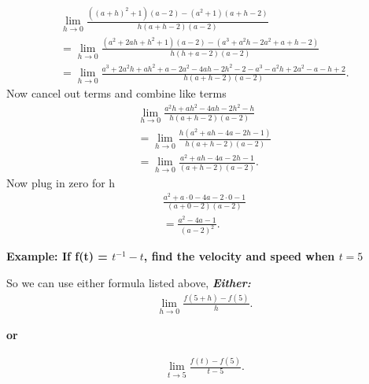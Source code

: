 \documentclass{report}
\begin{document}
        \begin{align*}
            \lim\limits_{h \to 0}{ \frac{ \left( \left(a+h\right)^2+1\right) \left(a-2\right) - \left(a^2+1\right) \left(a+h-2\right)}{h \left(a+h-2\right) \left(a-2\right)}} \\ 
            = \lim\limits_{h \to 0}{ \frac{ \left(a^2+2ah+h^2+1\right) \left(a-2\right) - \left(a^3+a^2h-2a^2+a+h-2\right)}{h \left(h+a-2\right)(a-2)}} \\ 
            = \lim\limits_{h \to 0}{ \frac{a^3+2a^2h+ah^2+a-2a^2-4ah-2h^2-2-a^3-a^2h+2a^2-a-h+2}{h \left(a+h-2\right)(a-2)}}
        .\end{align*}
        \bigbreak \noindent 
        Now cancel out terms and combine like terms
        \begin{align*}
            \lim\limits_{h \to 0}{ \frac{a^2h+ah^2-4ah-2h^2-h}{h (a+h-2)(a-2)}} \\ 
            = \lim\limits_{h \to 0}{ \frac{h (a^2+ah-4a-2h-1)}{h (a+h-2)(a-2)}} \\
            = \lim\limits_{h \to 0}{ \frac{a^2+ah-4a-2h-1}{(a+h-2)(a-2)}}
        .\end{align*}
        \bigbreak \noindent 
        Now plug in zero for h
        \begin{align*}
            \frac{a^2+a \cdot 0 - 4a -2 \cdot 0 -1}{(a+0-2)(a-2)} \\
            = \frac{a^2-4a-1}{(a-2)^2}
        .\end{align*}

        \pagebreak \bigbreak \noindent
        \begin{large}
            \textbf{Example: If f(t) = $t^{-1} -t$, find the velocity and speed when $t=5$}
        \end{large}

        \bigbreak \noindent \bigbreak \noindent 
        So we can use either formula listed above, \textbf{\textit{Either:}}
        \begin{align*}
            \lim\limits_{h \to 0}{ \frac{f(5+h) - f(5)}{h}} 
        .\end{align*}

        \bigbreak \noindent 
        \begin{center}
            \textbf{or}
        \end{center}

        \begin{align*}
            \lim\limits_{t \to 5}{ \frac{f(t) - f(5)}{t-5}}
        .\end{align*}
\end{document}

